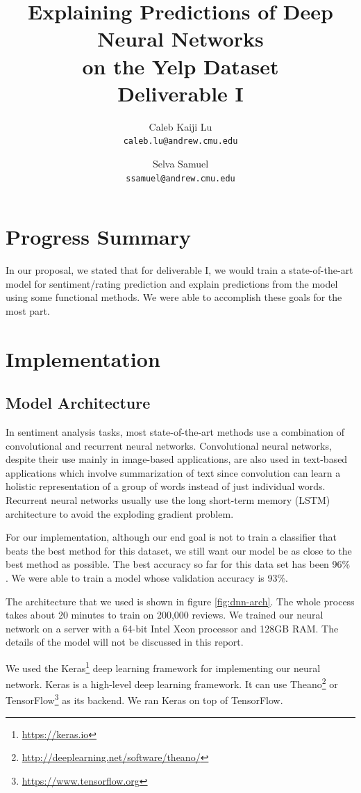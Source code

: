 \documentclass[11pt]{article}
\title{Explaining Predictions of Deep Neural Networks \\ on the Yelp Dataset \\ Deliverable I}
\author{
	Caleb Kaiji Lu \\
	{\tt caleb.lu@andrew.cmu.edu}
	\and
	Selva Samuel \\
	{\tt ssamuel@andrew.cmu.edu}
}
\date{}
\begin{document}
\maketitle

\section{Progress Summary}

In our proposal, we stated that for deliverable I, we would train a state-of-the-art model for sentiment/rating prediction and explain predictions from the model using some functional methods. We were able to accomplish these goals for the most part.

\section{Implementation}

\subsection{Model Architecture}

In sentiment analysis tasks, most state-of-the-art methods use a combination of convolutional and recurrent neural networks. Convolutional neural networks, despite their use mainly in image-based applications, are also used in text-based applications which involve summarization of text since convolution can learn a holistic representation of a group of words instead of just individual words. Recurrent neural networks usually use the long short-term memory (LSTM) architecture to avoid the exploding gradient problem.

For our implementation, although our end goal is not to train a classifier that beats the best method for this dataset, we still want our model be as close to the best method as possible. The best accuracy so far for this data set has been 96\% \cite{Tang2015}. We were able to train a model whose validation accuracy is 93\%. 

The architecture that we used is shown in figure \ref{fig:dnn-arch}. The whole process takes about 20 minutes to train on 200,000 reviews. We trained our neural network on a server with a 64-bit Intel Xeon processor and 128GB RAM. The details of the model will not be discussed in this report.

We used the Keras\footnote{\url{https://keras.io}} deep learning framework for implementing our neural network. Keras is a high-level deep learning framework. It can use Theano\footnote{\url{http://deeplearning.net/software/theano/}} or TensorFlow\footnote{\url{https://www.tensorflow.org}} as its backend. We ran Keras on top of TensorFlow.
\end{document}
